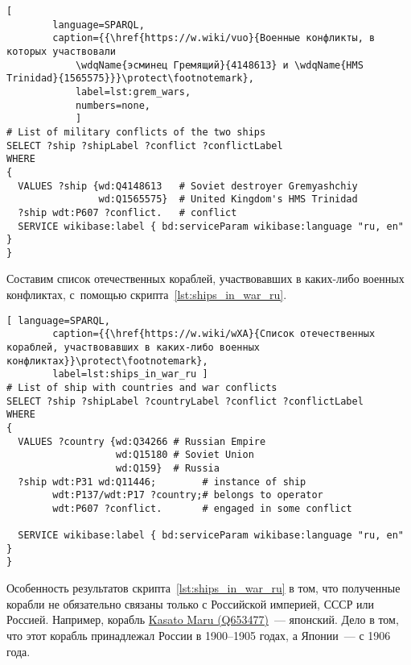 \begin{lstlisting}[ 
        language=SPARQL, 
        caption={{\href{https://w.wiki/vuo}{Военные конфликты, в которых участвовали 
            \wdqName{эсминец Гремящий}{4148613} и \wdqName{HMS Trinidad}{1565575}}}\protect\footnotemark}, 
            label=lst:grem_wars, 
            numbers=none,
            ]
# List of military conflicts of the two ships 
SELECT ?ship ?shipLabel ?conflict ?conflictLabel
WHERE
{
  VALUES ?ship {wd:Q4148613   # Soviet destroyer Gremyashchiy
                wd:Q1565575}  # United Kingdom's HMS Trinidad
  ?ship wdt:P607 ?conflict.   # conflict
  SERVICE wikibase:label { bd:serviceParam wikibase:language "ru, en" }
}
\end{lstlisting}




\newpage
Составим список отечественных кораблей, 
участвовавших в каких-либо военных конфликтах, 
с~помощью скрипта~\ref{lst:ships_in_war_ru}.

\begin{lstlisting}[ language=SPARQL, 
        caption={{\href{https://w.wiki/wXA}{Список отечественных кораблей, участвовавших в каких-либо военных конфликтах}}\protect\footnotemark}, 
        label=lst:ships_in_war_ru ]
# List of ship with countries and war conflicts
SELECT ?ship ?shipLabel ?countryLabel ?conflict ?conflictLabel
WHERE
{
  VALUES ?country {wd:Q34266 # Russian Empire
                   wd:Q15180 # Soviet Union
                   wd:Q159}  # Russia
  ?ship wdt:P31 wd:Q11446;        # instance of ship
        wdt:P137/wdt:P17 ?country;# belongs to operator
        wdt:P607 ?conflict.       # engaged in some conflict

  SERVICE wikibase:label { bd:serviceParam wikibase:language "ru, en" }
}
\end{lstlisting}

Особенность результатов скрипта~\ref{lst:ships_in_war_ru} в том, 
что полученные корабли не обязательно связаны только с Российской империей, 
СССР или Россией. 
Например, корабль \href{https://www.wikidata.org/wiki/Q653477}{Kasato Maru (Q653477)}~--- японский. 
Дело в том, что этот корабль принадлежал России в 1900--1905 годах, а Японии~--- с 1906 года.



